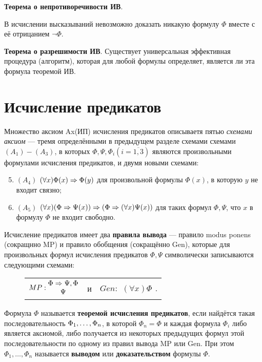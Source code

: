 \textbf{Теорема о непротиворечивости ИВ}.

В исчислении высказываний невозможно доказать никакую формулу $\Phi$ вместе с её отрицанием $\lnot \Phi$.



\textbf{Теорема о разрешимости ИВ}.
Существует универсальная эффективная процедура (алгоритм), которая для любой формулы определяет, является ли эта формула теоремой ИВ.

\section{Исчисление предикатов}
Множество аксиом Ax(ИП) исчисления предикатов описываетя пятью \textit{схемами аксиом} --- тремя определёнными в предыдущем разделе схемами схемами $(A_1)-(A_3)$, в которых $\Phi, \Psi, \Phi_i (i = \overline{1,3})$ являются произвольными формулами исчисления предикатов, и двумя новыми схемами:
\begin{enumerate}
    \setcounter{enumi}{4}
    \item $(A_4)$ $(\forall x)\Phi(x) \then \Phi(y)$ для произвольной формулы $\Phi(x)$, в которую $y$ не входит связно;
    \item $(A_5)$ $(\forall x)(\Phi \then \Psi(x)) \then (\Phi \then (\forall x)\Psi(x))$ для таких формул $\Phi, \Psi$, что $x$ в формулу $\Phi$ не входит свободно.
\end{enumerate}

Исчисление предикатов имеет два \textbf{правила вывода} --- правило modus ponens (сокращнно MP) и правило обобщения (сокращённо Gen), которые для произвольных формул исчисления предикатов $\Phi, \Psi$ символически записываются следующими схемами:
\begin{figure}[H]
    \centering
    \begin{tabular*}{0.5\textwidth}{@{\extracolsep{\fill}}ccc@{}}
        $MP: \begin{matrix}
            \Phi \then \Psi, \Phi \\
            \Psi
        \end{matrix}$ &
        и &
        $Gen: \begin{matrix}
            (\forall x)\Phi
        \end{matrix}$.
    \end{tabular*}
\end{figure}

\dftion Формула $\Phi$ называется \textbf{теоремой исчисления предикатов}, если найдётся такая последовательность $\xses[\Phi]$, в которой $\Phi_n = \Phi$ и каждая формула $\Phi_i$ либо является аксиомой, либо получается из некоторых предыдущих формул этой последовательности по одному из правил вывода MP или Gen. При этом $\Phi_1, \dots, \Phi_n$ называется \textbf{выводом} или \textbf{доказательством} формулы $\Phi$.

